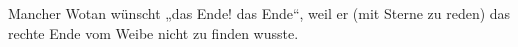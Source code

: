 Mancher Wotan wünscht „das Ende! das Ende“, weil er (mit Sterne zu reden) das rechte Ende vom Weibe nicht zu finden wusste.
\par

